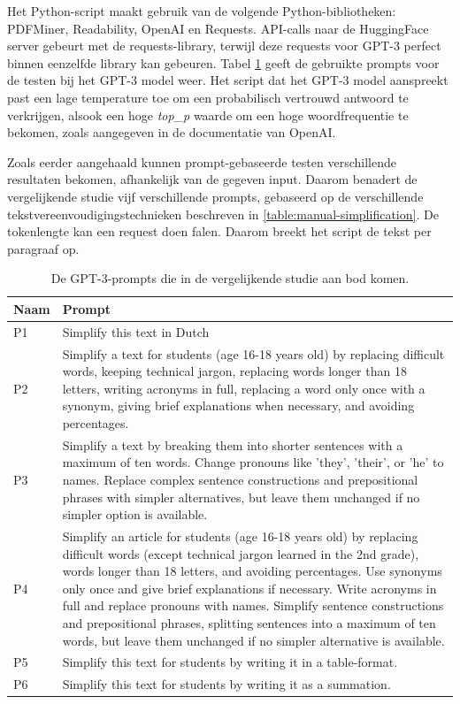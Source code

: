 Het Python-script maakt gebruik van de volgende Python-bibliotheken: PDFMiner, Readability, OpenAI en Requests. API-calls naar de HuggingFace server gebeurt met de requests-library, terwijl deze requests voor GPT-3 perfect binnen eenzelfde library kan gebeuren. Tabel \ref{table:tested-prompts} geeft de gebruikte prompts voor de testen bij het GPT-3 model weer. Het script dat het GPT-3 model aanspreekt past een lage temperature toe om een probabilisch vertrouwd antwoord te verkrijgen, alsook een hoge \textit{top\_p} waarde om een hoge woordfrequentie te bekomen, zoals aangegeven in de documentatie van OpenAI.

\medspace

Zoals eerder aangehaald kunnen prompt-gebaseerde testen verschillende resultaten bekomen, afhankelijk van de gegeven input. Daarom benadert de vergelijkende studie vijf verschillende prompts, gebaseerd op de verschillende tekstvereenvoudigingstechnieken beschreven in \ref{table:manual-simplification}. De tokenlengte kan een request doen falen. Daarom breekt het script de tekst per paragraaf op.

\begin{center}
	\begin{table}[H]
		\begin{tabular}{ | m{2cm} | m{14cm} | } 
			\hline
			\textbf{Naam} & \textbf{Prompt} \\
			\hline
			P1 & Simplify this text in Dutch \\
			\hline
			P2 & Simplify a text for students (age 16-18 years old) by replacing difficult words, keeping technical jargon, replacing words longer than 18 letters, writing acronyms in full, replacing a word only once with a synonym, giving brief explanations when necessary, and avoiding percentages. \\
			\hline
			P3 & Simplify a text by breaking them into shorter sentences with a maximum of ten words. Change pronouns like 'they', 'their', or 'he' to names. Replace complex sentence constructions and prepositional phrases with simpler alternatives, but leave them unchanged if no simpler option is available. \\
			\hline
			P4 & Simplify an article for students (age 16-18 years old) by replacing difficult words (except technical jargon learned in the 2nd grade), words longer than 18 letters, and avoiding percentages. Use synonyms only once and give brief explanations if necessary. Write acronyms in full and replace pronouns with names. Simplify sentence constructions and prepositional phrases, splitting sentences into a maximum of ten words, but leave them unchanged if no simpler alternative is available. \\
			\hline
			P5 & Simplify this text for students by writing it in a table-format. \\
			\hline
			P6 & Simplify this text for students by writing it as a summation. \\
			\hline
		\end{tabular}
		\label{table:tested-prompts}
		\caption{De GPT-3-prompts die in de vergelijkende studie aan bod komen.}
	\end{table}
\end{center}


